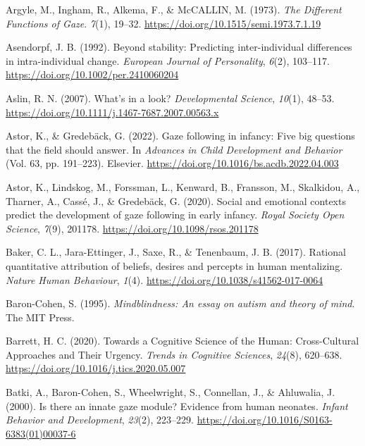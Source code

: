 \documentclass[
]{scrbook}
\newlength{\cslhangindent}
\newenvironment{CSLReferences}[2] %
 {\begin{list}{}{%
  \setlength{\itemindent}{0pt}
  \setlength{\leftmargin}{0pt}
  \setlength{\parsep}{0pt}
  \ifodd #1
   \setlength{\leftmargin}{\cslhangindent}
   \setlength{\itemindent}{-1\cslhangindent}
  \fi
  \setlength{\itemsep}{#2\baselineskip}}}
 {\end{list}}
\begin{document}
\begin{CSLReferences}{1}{0}
Argyle, M., Ingham, R., Alkema, F., \& McCALLIN, M. (1973). \emph{The {Different Functions} of {Gaze}}. \emph{7}(1), 19--32. \url{https://doi.org/10.1515/semi.1973.7.1.19}

Asendorpf, J. B. (1992). Beyond stability: {Predicting} inter-individual differences in intra-individual change. \emph{European Journal of Personality}, \emph{6}(2), 103--117. \url{https://doi.org/10.1002/per.2410060204}

Aslin, R. N. (2007). What's in a look? \emph{Developmental Science}, \emph{10}(1), 48--53. \url{https://doi.org/10.1111/j.1467-7687.2007.00563.x}

Astor, K., \& Gredebäck, G. (2022). Gaze following in infancy: {Five} big questions that the field should answer. In \emph{Advances in {Child Development} and {Behavior}} (Vol. 63, pp. 191--223). Elsevier. \url{https://doi.org/10.1016/bs.acdb.2022.04.003}

Astor, K., Lindskog, M., Forssman, L., Kenward, B., Fransson, M., Skalkidou, A., Tharner, A., Cassé, J., \& Gredebäck, G. (2020). Social and emotional contexts predict the development of gaze following in early infancy. \emph{Royal Society Open Science}, \emph{7}(9), 201178. \url{https://doi.org/10.1098/rsos.201178}

Baker, C. L., Jara-Ettinger, J., Saxe, R., \& Tenenbaum, J. B. (2017). Rational quantitative attribution of beliefs, desires and percepts in human mentalizing. \emph{Nature Human Behaviour}, \emph{1}(4). \url{https://doi.org/10.1038/s41562-017-0064}

Baron-Cohen, S. (1995). \emph{Mindblindness: {An} essay on autism and theory of mind}. The MIT Press.

Barrett, H. C. (2020). Towards a {Cognitive Science} of the {Human}: {Cross-Cultural Approaches} and {Their Urgency}. \emph{Trends in Cognitive Sciences}, \emph{24}(8), 620--638. \url{https://doi.org/10.1016/j.tics.2020.05.007}

Batki, A., Baron-Cohen, S., Wheelwright, S., Connellan, J., \& Ahluwalia, J. (2000). Is there an innate gaze module? {Evidence} from human neonates. \emph{Infant Behavior and Development}, \emph{23}(2), 223--229. \url{https://doi.org/10.1016/S0163-6383(01)00037-6}


\end{CSLReferences}
\end{document}
